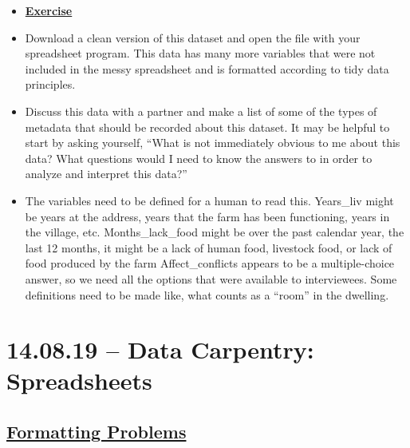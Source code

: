 \documentclass[12pt]{article}
\begin{document}
\color{gray}
\begin{itemize}
\renewcommand{\labelitemi}{$\nobullet$}
\item \textbf{\underline{Exercise}}
    \item Download a clean version of this dataset and open the file with your spreadsheet program. This data has many more variables that were not included in the messy spreadsheet and is formatted according to tidy data principles.
    \item Discuss this data with a partner and make a list of some of the types of metadata that should be recorded about this dataset. It may be helpful to start by asking yourself, “What is not immediately obvious to me about this data? What questions would I need to know the answers to in order to analyze and interpret this data?”
\end{itemize}

\color{black}
\begin{itemize}
\renewcommand{\labelitemi}{$\nobullet$}
    \item The variables need to be defined for a human to read this. Years\_liv might be years at the address, years that the farm has been functioning, years in the village, etc. Months\_lack\_food might be over the past calendar year, the last 12 months, it might be a lack of human food, livestock food, or lack of food produced by the farm
    \vspace{0.5em}
    \newline Affect\_conflicts appears to be a multiple-choice answer, so we need all the options that were available to interviewees.
    \vspace{0.5em}
    \newline Some definitions need to be made like, what counts as a “room” in the dwelling.
\end{itemize}

\newpage\section{14.08.19 – Data Carpentry: Spreadsheets}

\subsection{\textbf{\href{https://datacarpentry.org/spreadsheets-socialsci/02-common-mistakes/index.html}{Formatting Problems}}}
\end{document}
